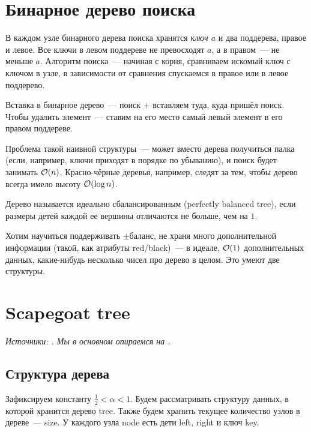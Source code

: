 \section{Бинарное дерево поиска} 

В каждом узле бинарного дерева поиска хранятся {\it ключ $a$} и два поддерева, правое и левое. Все ключи в левом поддереве не превосходят $a$, а в правом~--- не меньше $a$. Алгоритм поиска~--- начиная с корня, сравниваем искомый ключ с ключом в узле, в зависимости от сравнения спускаемся в правое или в левое поддерево.

Вставка в бинарное дерево~--- поиск $+$ вставляем туда, куда пришёл поиск. Чтобы удалить элемент~--- ставим на его место самый левый элемент в его правом поддереве.

Проблема такой наивной структуры~--- может вместо дерева получиться палка (если, например, ключи приходят в порядке по убыванию), и поиск будет занимать $\mathcal{O}(n)$. Красно-чёрные деревья, например, следят за тем, чтобы дерево всегда имело высоту $\mathcal{O}(\log n)$.

\begin{definition}
	Дерево называется идеально сбалансированным (perfectly balanced tree), если размеры детей каждой ее вершины отличаются не больше, чем на $1$.
\end{definition}

Хотим научиться поддерживать $\pm$баланс, не храня много дополнительной информации (такой, как атрибуты red/black)~--- в идеале, $\mathcal{O}(1)$ дополнительных данных, какие-нибудь несколько чисел про дерево в целом. Это умеют две структуры.

\section{Scapegoat tree} 

 {\it Источники: \cite{galperin1993scapegoat,andersson1989improving}. Мы в основном опираемся на \cite{galperin1993scapegoat}.}

 \subsection{Структура дерева}

Зафиксируем константу $\frac{1}{2} < \alpha < 1$. Будем рассматривать структуру данных, в которой хранится дерево tree. Также будем хранить текущее количество узлов в дереве~--- size. У каждого узла node есть дети left, right и ключ key.

